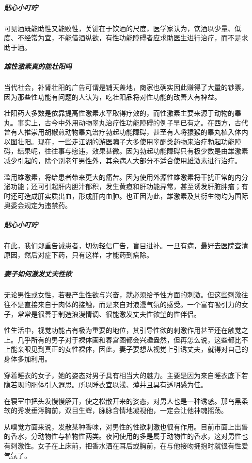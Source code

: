 \subparagraph{贴心小叮咛}

可见酒既能助性又能败性，关键在于饮酒的尺度，医学家认为，饮酒以少量、低度、不经常为宜，不能借酒纵欲，有性功能障碍者应求助医生进行治疗，而不是求助于酒。

\subparagraph{雄性激素真的能壮阳吗}

当代社会，补肾壮阳的广告可谓是铺天盖地，商家也确实因此赚得了大量的钞票，因为那些性功能有问题的人认为，吃壮阳品将对性功能的改善大有裨益。

壮阳药大多数是依靠提高性激素水平取得疗效的，而性激素主要来源于动物的睾丸。事实上，古今中外用动物睾丸治疗性功能障碍的例子早已有之。在西方，古代曾有人推崇用胡椒煎动物睾丸治疗勃起功能障碍，甚至有人将猿猴的睾丸植入体内以图壮阳。现在，一些走江湖的游医骗子大多使用睾酮类药物来治疗勃起功能障碍，结果呢，往往事与愿违，效果甚微。因为勃起功能障碍只有极少数是由雄激素减少引起的，除个别老年男性外，其余病人大部分不适合使用雄激素进行治疗。

滥用雄激素，将给患者带来更大的痛苦。因为使用外源性雄激素将干扰正常的内分泌功能；还可引起肝内胆汁郁积，发生黄疸和肝功能异常，甚至诱发肝脏肿瘤；有时还可造成肝实质出血，形成肝内血肿。也正因为此，雄激素及其衍生物均为国际奥委会规定为违禁药。

\subparagraph{贴心小叮咛}

在此，我们郑重告诫患者，切勿轻信广告，盲目进补。一旦有病，最好去医院查清原因，然后对症下药，只有这样，才能药到病除。

\subparagraph{妻子如何激发丈夫性欲}

无论男性或女性，若要产生性欲与兴奋，就必须给予性方面的刺激。但这些刺激往往不是直接来自于肉体的接触，而是来自对浪漫气氛的感受。一个富有吸引力的女子，常常是很善于制造浪漫情调、很能激发丈夫性欲望的性伴侣。

性生活中，视觉功能占有极为重要的地位，其引导性欲的刺激作用甚至还在触觉之上。几乎所有的男子对于裸体画和春宫图都会兴趣盎然，但再怎么说，这些都比不上能亲眼见到真正的女性裸体，因此，妻子要想从视觉上引诱丈夫，就得对自己的身体多加利用。

穿着睡衣的女子，她的姿态对男子具有相当大的魅力。主要是因为来自睡衣底下若隐若现的胴体引人遐思。所以睡衣宜以浅、薄并且具有透明感为佳。

在寝室中把头发慢慢解开，使之松散开来的姿态，对男人也是一种诱惑。那乌黑柔软的秀发垂泻胸前，双目生辉，脉脉含情地凝视他，一定会让他神魂摇荡。

从嗅觉方面来说，发散某种香味，对男性的性欲刺激也很有作用。目前市面上出售的香水，分动物性与植物性两类。夜间使用的多是属于动物性的香水，这对男性也有刺激性。女子在上床前，把香水洒在耳后或胸前，在与他接吻拥抱时就很有性爱气氛了。

